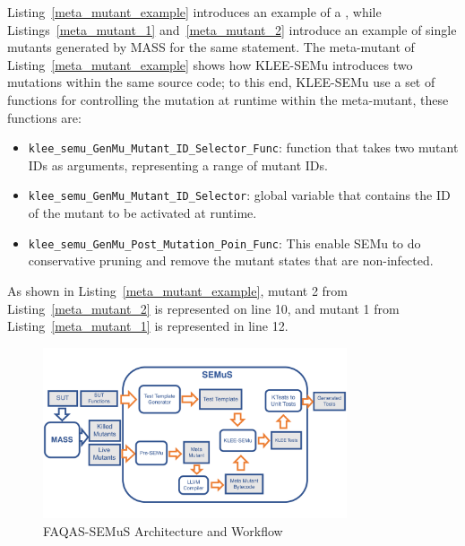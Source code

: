 


Listing~\ref{meta_mutant_example} introduces an example of a , while Listings~\ref{meta_mutant_1} and~\ref{meta_mutant_2} introduce an example of single mutants generated by MASS for the same statement.
The meta-mutant of Listing~\ref{meta_mutant_example} shows how KLEE-SEMu introduces two mutations within the same source code; to this end, KLEE-SEMu use a set of functions for controlling the mutation at runtime within the meta-mutant, these functions are:

\begin{itemize}
	\item \texttt{klee\_semu\_GenMu\_Mutant\_ID\_Selector\_Func}: function that takes two mutant IDs as arguments, representing a range of mutant IDs.
    \item \texttt{klee\_semu\_GenMu\_Mutant\_ID\_Selector}: global variable that contains the ID of the mutant to be activated at runtime.
	\item \texttt{klee\_semu\_GenMu\_Post\_Mutation\_Poin\_Func}: This enable SEMu to do conservative pruning and remove the mutant states that are non-infected.
\end{itemize}

As shown in Listing~\ref{meta_mutant_example}, mutant 2 from Listing~\ref{meta_mutant_2} is represented on line 10, and mutant 1 from Listing~\ref{meta_mutant_1} is represented in line 12.


\begin{figure}[tb]
\begin{center}
\includegraphics[width=0.8\textwidth]{images/semus-architecture}
\caption{FAQAS-SEMuS Architecture and Workflow}
\label{fig:semus_architecture}
\end{center}
\end{figure}

